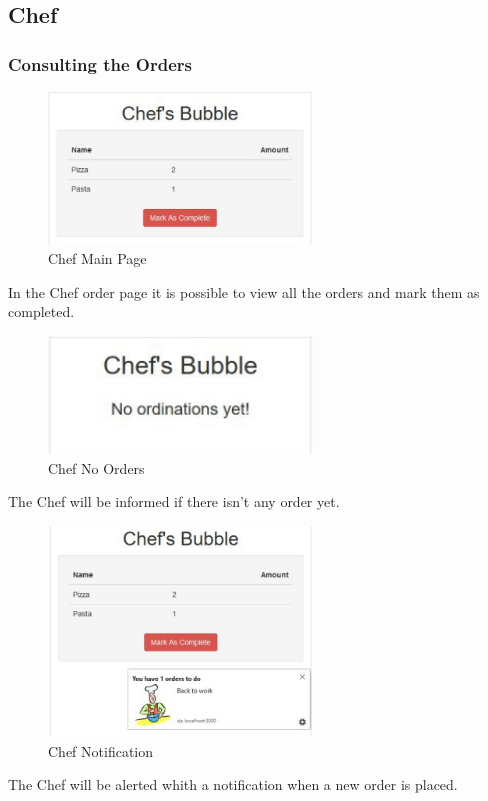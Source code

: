 \subsection{Chef}
\subsubsection{Consulting the Orders}
\begin{figure}[H]
	\centering
	\includegraphics[width=7cm]{../../documenti/UserManualDemo/demo_screens/chef_orders.png}
	\caption{Chef Main Page}
\end{figure}
In the Chef order page it is possible to view all the orders and mark them as completed.

\begin{figure}[H]
	\centering
	\includegraphics[width=7cm]{../../documenti/UserManualDemo/demo_screens/chef_none.png}
	\caption{Chef No Orders}
\end{figure}
The Chef will be informed if there isn't any order yet.

\begin{figure}[H]
	\centering
	\includegraphics[width=7cm]{../../documenti/UserManualDemo/demo_screens/chef_notification.png}
	\caption{Chef Notification}
\end{figure}
The Chef will be alerted whith a notification when a new order is placed.

